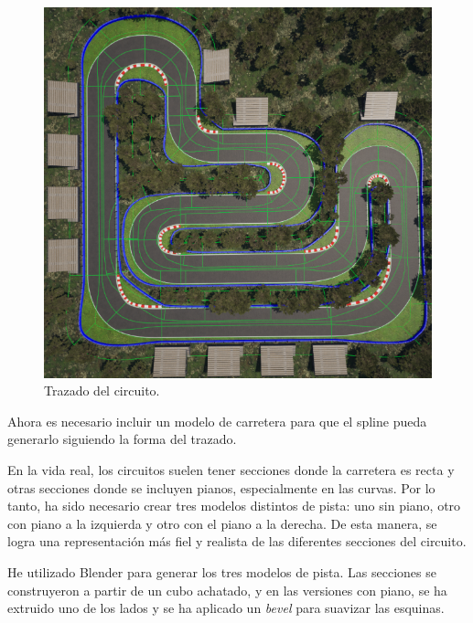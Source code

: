 \begin{figure}[H]
    \centering
    \includegraphics[width=\textwidth]{imagenes/trazadoFinal.png}
    \caption{Trazado del circuito.}
    \label{fig:trazado}
\end{figure}

Ahora es necesario incluir un modelo de carretera para que el spline pueda generarlo siguiendo la forma del trazado.

\bigskip

En la vida real, los circuitos suelen tener secciones donde la carretera es recta y otras secciones donde se incluyen pianos, especialmente en las curvas. Por lo tanto, ha sido necesario crear tres modelos distintos de pista: uno sin piano, otro con piano a la izquierda y otro con el piano a la derecha. De esta manera, se logra una representación más fiel y realista de las diferentes secciones del circuito.

\bigskip

He utilizado Blender para generar los tres modelos de pista. Las secciones se construyeron a partir de un cubo achatado, y en las versiones con piano, se ha extruido uno de los lados y se ha aplicado un \textit{bevel} para suavizar las esquinas.

